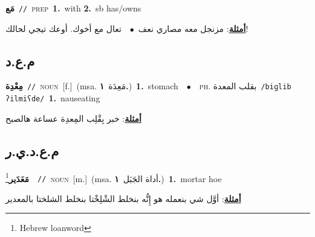 \documentclass[10pt,a4paper,twoside]{article} %
\begin{document}
\begin{multicols}{2}
{\setlength\topsep{0pt}\textbf{\foreignlanguage{arabic}{مَع}}\ {\color{gray}\texttt{//}\color{black}}\ \textsc{prep}\ \textbf{1.}~with  \textbf{2.}~sb has/owns\  \begin{flushright}\color{gray}\foreignlanguage{arabic}{\textbf{\underline{\foreignlanguage{arabic}{أمثلة}}}: مزنجل معه مصاري نعف\ $\bullet$\ \  تعال مع أخوك. أوعك تيجي لحالك!}\end{flushright}\color{black}} \vspace{2mm}

\vspace{-3mm}
\subsection*{\color{blue}\foreignlanguage{arabic}{م.ع.د}\color{blue}{}} 

{\setlength\topsep{0pt}\textbf{\foreignlanguage{arabic}{مِعْدِة}}\ {\color{gray}\texttt{//}\color{black}}\ \textsc{noun}\ [f.]\ \color{gray}(msa. \foreignlanguage{arabic}{مَعِدَة}~\foreignlanguage{arabic}{\textbf{١.}})\color{black}\ \textbf{1.}~stomach\ \ $\bullet$\ \ \textsc{ph.} \color{gray} \foreignlanguage{arabic}{بقلب المعدة}\color{black}\ {\color{gray}\texttt{/{\sffamily biɡlib ʔilmiʕde}/}\color{black}}\ \textbf{1.}~nauseating\  \begin{flushright}\color{gray}\foreignlanguage{arabic}{\textbf{\underline{\foreignlanguage{arabic}{أمثلة}}}: خبر بِقْلِب المِعدِة عساعة هالصبح}\end{flushright}\color{black}} \vspace{2mm}

\vspace{-3mm}
\subsection*{\color{blue}\foreignlanguage{arabic}{م.ع.د.ي.ر}\color{blue}{ (ntws)}} 

{\setlength\topsep{0pt}\textbf{\foreignlanguage{arabic}{مَعَدَير}}\footnote{Hebrew loanword}\ \ {\color{gray}\texttt{//}\color{black}}\ \textsc{noun}\ [m.]\ \color{gray}(msa. \foreignlanguage{arabic}{أداة الجَبَل}~\foreignlanguage{arabic}{\textbf{١.}})\color{black}\ \textbf{1.}~mortar hoe\  \begin{flushright}\color{gray}\foreignlanguage{arabic}{\textbf{\underline{\foreignlanguage{arabic}{أمثلة}}}: أوَّل شي بنعمله هو إِنُّه بنخلط الشْلِخْتا بنخلط الشلختا بالمعدير}\end{flushright}\color{black}} \vspace{2mm}


\end{multicols}
\end{document}
